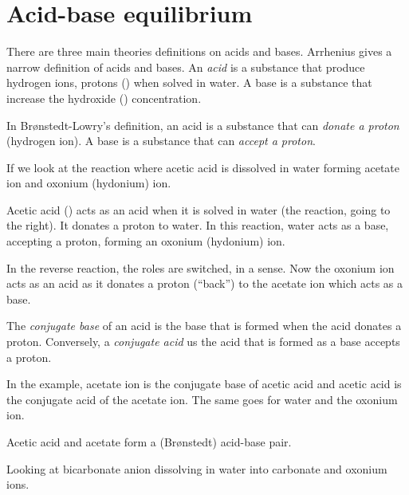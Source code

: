\documentclass[../mit-general-chemistry.tex]{subfiles}
\begin{document}
\chapter{Acid-base equilibrium}




There are three main theories definitions on acids and
bases. Arrhenius gives a narrow definition of acids and bases. An {\em
  acid} is a substance that produce hydrogen ions, protons ()
when solved in water. A base is a substance that increase the
hydroxide () concentration.


In Brønstedt-Lowry's definition, an acid is a substance that can {\em
  donate a proton} (hydrogen ion). A base is a substance that can {\em accept a
  proton}.

\paragraphbreak
  
If we look at the reaction where acetic acid is dissolved in water
forming acetate ion and oxonium (hydonium) ion.


Acetic acid () acts as an acid when it is solved in water
(the reaction, going to the right). It donates a proton to water. In
this reaction, water acts as a base, accepting a proton, forming an
oxonium (hydonium) ion.

In the reverse reaction, the roles are switched, in a sense. Now the
oxonium ion acts as an acid as it donates a proton (``back'') to the
acetate ion which acts as a base.

The {\em conjugate base} of an acid is the base that is formed when
the acid donates a proton. Conversely, a {\em conjugate acid} us the
acid that is formed as a base accepts a proton.

In the example, acetate ion is the conjugate base of acetic acid and
acetic acid is the conjugate acid of the acetate ion. The same goes
for water and the oxonium ion.

Acetic acid and acetate form a (Brønstedt) acid-base pair.


\paragraphbreak

Looking at bicarbonate anion dissolving in water into carbonate and
oxonium ions.

\end{document}
